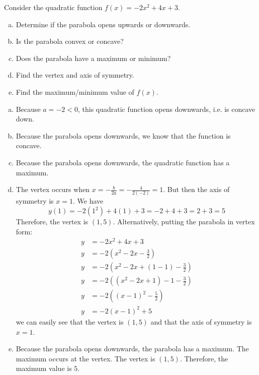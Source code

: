 \documentclass[11pt,letterpaper]{article}
\begin{document}
\newpage



 Consider the quadratic function $f(x)= -2x^2 + 4x + 3$.
        \begin{enumerate}[(a)]
        \item Determine if the parabola opens upwards or downwards.
        \item Is the parabola convex or concave?
        \item Does the parabola have a maximum or minimum? 
        \item Find the vertex and axis of symmetry. 
        \item Find the maximum/minimum value of $f(x)$. 
        \end{enumerate} \pspace

\sol
\begin{enumerate}[(a)]
\item Because $a= -2 < 0$, this quadratic function opens downwards, i.e. is concave down. \pspace

\item Because the parabola opens downwards, we know that the function is concave. \pspace

\item Because the parabola opens downwards, the quadratic function has a maximum. \pspace

\item The vertex occurs when $x= -\frac{b}{2a}= -\frac{4}{2(-2)}= 1$. But then the axis of symmetry is $x= 1$. We have
	\[
	y(1)= -2(1^2) + 4(1) + 3= -2 + 4 + 3= 2 + 3= 5
	\]
Therefore, the vertex is $(1, 5)$. Alternatively, putting the parabola in vertex form:
	\[
	\begin{aligned}
	y&= -2x^2 + 4x + 3 \\[0.3cm]
	y&= -2 \left(x^2 - 2x - \frac{3}{2} \right) \\[0.3cm]
	y&= -2 \left(x^2 - 2x + (1 - 1) - \frac{3}{2} \right) \\[0.3cm] 
	y&= -2 \left( (x^2 - 2x + 1) - 1 - \frac{3}{2} \right) \\[0.3cm] 
	y&= -2 \left( (x - 1)^2 - \frac{5}{2} \right) \\[0.3cm] 
	y&= -2(x - 1)^2 + 5
	\end{aligned}
	\]
we can easily see that the vertex is $(1, 5)$ and that the axis of symmetry is $x= 1$. \pspace
 
\item Because the parabola opens downwards, the parabola has a maximum. The maximum occurs at the vertex. The vertex is $(1, 5)$. Therefore, the maximum value is $5$.  
\end{enumerate}
\end{document}
